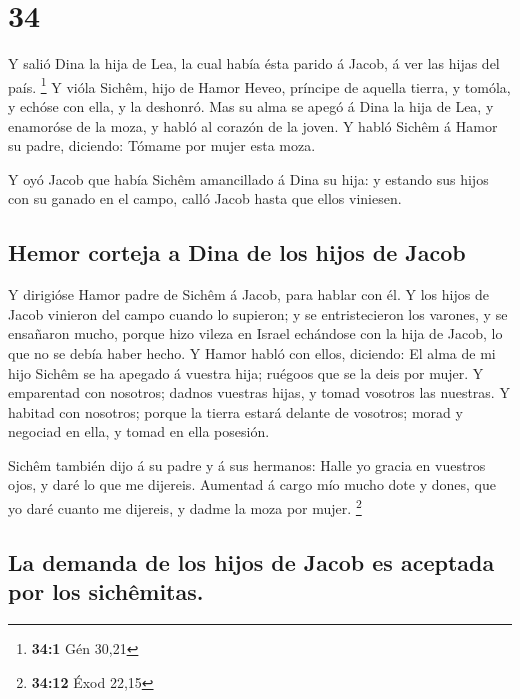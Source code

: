 \hypertarget{section-33}{%
\section{34}\label{section-33}}

 Y salió Dina la hija de Lea, la cual había ésta parido á
Jacob, á ver las hijas del país. \footnote{\textbf{34:1} Gén 30,21}
 Y vióla Sichêm, hijo de Hamor Heveo, príncipe de aquella
tierra, y tomóla, y echóse con ella, y la deshonró.  Mas
su alma se apegó á Dina la hija de Lea, y enamoróse de la moza, y habló
al corazón de la joven.  Y habló Sichêm á Hamor su padre,
diciendo: Tómame por mujer esta moza.

 Y oyó Jacob que había Sichêm amancillado á Dina su hija:
y estando sus hijos con su ganado en el campo, calló Jacob hasta que
ellos viniesen.

\hypertarget{hemor-corteja-a-dina-de-los-hijos-de-jacob}{%
\subsection{Hemor corteja a Dina de los hijos de
Jacob}\label{hemor-corteja-a-dina-de-los-hijos-de-jacob}}

 Y dirigióse Hamor padre de Sichêm á Jacob, para hablar
con él.  Y los hijos de Jacob vinieron del campo cuando lo
supieron; y se entristecieron los varones, y se ensañaron mucho, porque
hizo vileza en Israel echándose con la hija de Jacob, lo que no se debía
haber hecho.  Y Hamor habló con ellos, diciendo: El alma
de mi hijo Sichêm se ha apegado á vuestra hija; ruégoos que se la deis
por mujer.  Y emparentad con nosotros; dadnos vuestras
hijas, y tomad vosotros las nuestras.  Y habitad con
nosotros; porque la tierra estará delante de vosotros; morad y negociad
en ella, y tomad en ella posesión.

 Sichêm también dijo á su padre y á sus hermanos: Halle
yo gracia en vuestros ojos, y daré lo que me dijereis. 
Aumentad á cargo mío mucho dote y dones, que yo daré cuanto me dijereis,
y dadme la moza por mujer. \footnote{\textbf{34:12} Éxod 22,15}

\hypertarget{la-demanda-de-los-hijos-de-jacob-es-aceptada-por-los-sichuxeamitas.}{%
\subsection{La demanda de los hijos de Jacob es aceptada por los
sichêmitas.}\label{la-demanda-de-los-hijos-de-jacob-es-aceptada-por-los-sichuxeamitas.}}

